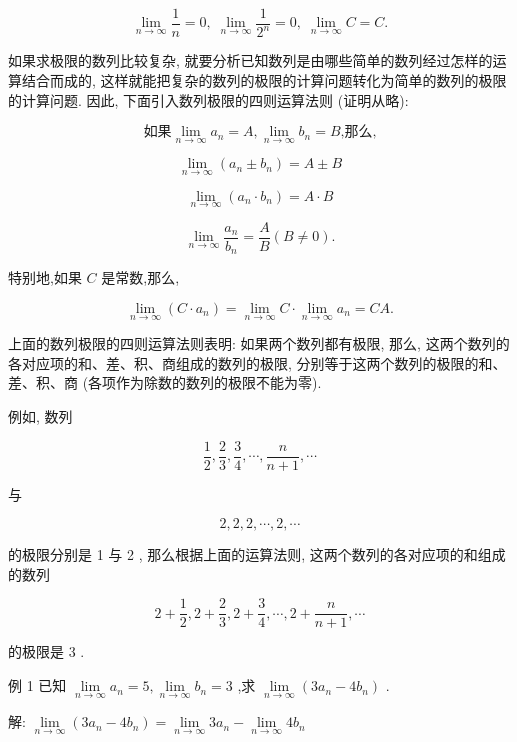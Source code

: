 \documentclass[10pt]{article}
\begin{document}
\[
\mathop{\lim }\limits_{{n \rightarrow \infty }}\frac{1}{n} = 0,\;\mathop{\lim }\limits_{{n \rightarrow \infty }}\frac{1}{{2}^{n}} = 0,\;\mathop{\lim }\limits_{{n \rightarrow \infty }}C = C.
\]

如果求极限的数列比较复杂, 就要分析已知数列是由哪些简单的数列经过怎样的运算结合而成的, 这样就能把复杂的数列的极限的计算问题转化为简单的数列的极限的计算问题. 因此, 下面引入数列极限的四则运算法则 (证明从略):

\[
\text{如果}\mathop{\lim }\limits_{{n \rightarrow \infty }}{a}_{n} = A,\mathop{\lim }\limits_{{n \rightarrow \infty }}{b}_{n} = B\text{,那么,}
\]

\[
\mathop{\lim }\limits_{{n \rightarrow \infty }}\left( {{a}_{n} \pm {b}_{n}}\right) = A \pm B
\]

\[
\mathop{\lim }\limits_{{n \rightarrow \infty }}\left( {{a}_{n} \cdot {b}_{n}}\right) = A \cdot B
\]

\[
\mathop{\lim }\limits_{{n \rightarrow \infty }}\frac{{a}_{n}}{{b}_{n}} = \frac{A}{B}\left( {B \neq 0}\right) .
\]

特别地,如果 \(C\) 是常数,那么,

\[
\mathop{\lim }\limits_{{n \rightarrow \infty }}\left( {C \cdot {a}_{n}}\right) = \mathop{\lim }\limits_{{n \rightarrow \infty }}C \cdot \mathop{\lim }\limits_{{n \rightarrow \infty }}{a}_{n} = {CA}.
\]

上面的数列极限的四则运算法则表明: 如果两个数列都有极限, 那么, 这两个数列的各对应项的和、差、积、商组成的数列的极限, 分别等于这两个数列的极限的和、差、积、商 (各项作为除数的数列的极限不能为零).

例如, 数列

\[
\frac{1}{2},\frac{2}{3},\frac{3}{4},\cdots ,\frac{n}{n + 1},\cdots
\]

与

\[
2,2,2,\cdots ,2,\cdots
\]

的极限分别是 1 与 2 , 那么根据上面的运算法则, 这两个数列的各对应项的和组成的数列

\[
2 + \frac{1}{2},2 + \frac{2}{3},2 + \frac{3}{4},\cdots ,2 + \frac{n}{n + 1},\cdots
\]

的极限是 3 .

例 1 已知 \(\mathop{\lim }\limits_{{n \rightarrow \infty }}{a}_{n} = 5,\mathop{\lim }\limits_{{n \rightarrow \infty }}{b}_{n} = 3\) ,求 \(\mathop{\lim }\limits_{{n \rightarrow \infty }}\left( {3{a}_{n} - 4{b}_{n}}\right)\) .

解: \(\mathop{\lim }\limits_{{n \rightarrow \infty }}\left( {3{a}_{n} - 4{b}_{n}}\right) = \mathop{\lim }\limits_{{n \rightarrow \infty }}3{a}_{n} - \mathop{\lim }\limits_{{n \rightarrow \infty }}4{b}_{n}\)
\end{document}
